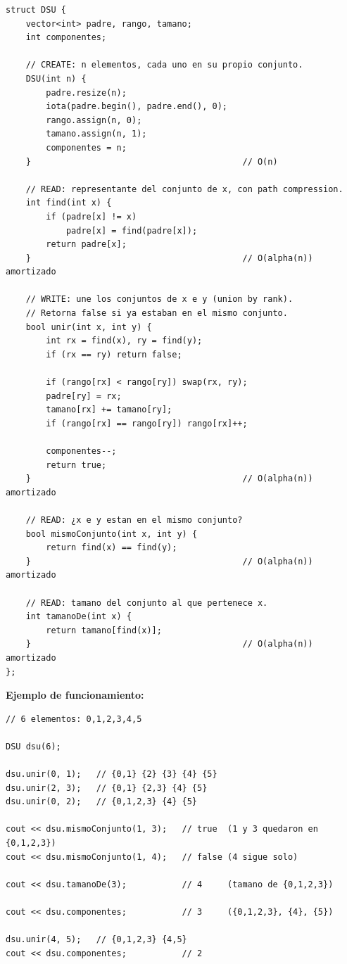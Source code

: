 \documentclass[10pt,a4paper,twocolumn]{article}
\begin{document}
\begin{lstlisting}[style=cpp]
struct DSU {
    vector<int> padre, rango, tamano;
    int componentes;

    // CREATE: n elementos, cada uno en su propio conjunto.
    DSU(int n) {
        padre.resize(n);
        iota(padre.begin(), padre.end(), 0);
        rango.assign(n, 0);
        tamano.assign(n, 1);
        componentes = n;
    }                                          // O(n)

    // READ: representante del conjunto de x, con path compression.
    int find(int x) {
        if (padre[x] != x)
            padre[x] = find(padre[x]);
        return padre[x];
    }                                          // O(alpha(n)) amortizado

    // WRITE: une los conjuntos de x e y (union by rank).
    // Retorna false si ya estaban en el mismo conjunto.
    bool unir(int x, int y) {
        int rx = find(x), ry = find(y);
        if (rx == ry) return false;

        if (rango[rx] < rango[ry]) swap(rx, ry);
        padre[ry] = rx;
        tamano[rx] += tamano[ry];
        if (rango[rx] == rango[ry]) rango[rx]++;

        componentes--;
        return true;
    }                                          // O(alpha(n)) amortizado

    // READ: ¿x e y estan en el mismo conjunto?
    bool mismoConjunto(int x, int y) {
        return find(x) == find(y);
    }                                          // O(alpha(n)) amortizado

    // READ: tamano del conjunto al que pertenece x.
    int tamanoDe(int x) {
        return tamano[find(x)];
    }                                          // O(alpha(n)) amortizado
};
\end{lstlisting}

\textbf{Ejemplo de funcionamiento:}

\begin{lstlisting}[style=cpp]
// 6 elementos: 0,1,2,3,4,5

DSU dsu(6);

dsu.unir(0, 1);   // {0,1} {2} {3} {4} {5}
dsu.unir(2, 3);   // {0,1} {2,3} {4} {5}
dsu.unir(0, 2);   // {0,1,2,3} {4} {5}

cout << dsu.mismoConjunto(1, 3);   // true  (1 y 3 quedaron en {0,1,2,3})
cout << dsu.mismoConjunto(1, 4);   // false (4 sigue solo)

cout << dsu.tamanoDe(3);           // 4     (tamano de {0,1,2,3})

cout << dsu.componentes;           // 3     ({0,1,2,3}, {4}, {5})

dsu.unir(4, 5);   // {0,1,2,3} {4,5}
cout << dsu.componentes;           // 2
\end{lstlisting}
\end{document}
